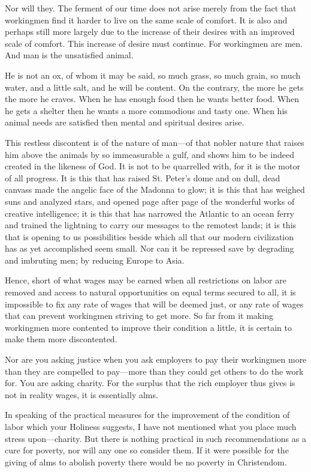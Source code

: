 \documentclass{book}
\begin{document}
Nor will they. The ferment of our time does not arise merely from the fact that workingmen find it harder to live on the same scale of comfort. It is also and perhaps still more largely due to the increase of their desires with an improved scale of comfort. This increase of desire must continue. For workingmen are men. And man is the unsatisfied animal.

He is not an ox, of whom it may be said, so much grass, so much grain, so much water, and a little salt, and he will be content. On the contrary, the more he gets the more he craves. When he has enough food then he wants better food. When he gets a shelter then he wants a more commodious and tasty one. When his animal needs are satisfied then mental and spiritual desires arise.

This restless discontent is of the nature of man—of that nobler nature that raises him above the animals by so immeasurable a gulf, and shows him to be indeed created in the likeness of God. It is not to be quarrelled with, for it is the motor of all progress. It is this that has raised St. Peter’s dome and on dull, dead canvass made the angelic face of the Madonna to glow; it is this that has weighed suns and analyzed stars, and opened page after page of the wonderful works of creative intelligence; it is this that has narrowed the Atlantic to an ocean ferry and trained the lightning to carry our messages to the remotest lands; it is this that is opening to us possibilities beside which all that our modern civilization has as yet accomplished seem small. Nor can it be repressed save by degrading and imbruting men; by reducing Europe to Asia.

Hence, short of what wages may be earned when all restrictions on labor are removed and access to natural opportunities on equal terms secured to all, it is impossible to fix any rate of wages that will be deemed just, or any rate of wages that can prevent workingmen striving to get more. So far from it making workingmen more contented to improve their condition a little, it is certain to make them more discontented.

Nor are you asking justice when you ask employers to pay their workingmen more than they are compelled to pay—more than they could get others to do the work for. You are asking charity. For the surplus that the rich employer thus gives is not in reality wages, it is essentially alms.

In speaking of the practical measures for the improvement of the condition of labor which your Holiness suggests, I have not mentioned what you place much stress upon—charity. But there is nothing practical in such recommendations as a cure for poverty, nor will any one so consider them. If it were possible for the giving of alms to abolish poverty there would be no poverty in Christendom.
\end{document}
